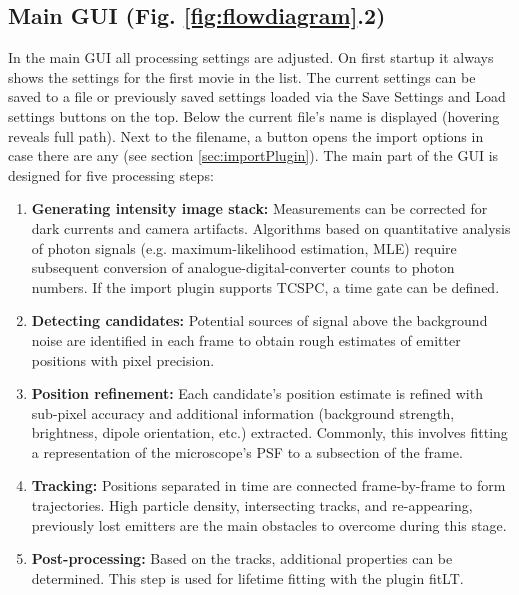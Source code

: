 \documentclass[11pt,onside]{report}
\numberwithin{equation}{chapter}
\begin{document}
\subsection{Main GUI (Fig. \ref{fig:flowdiagram}.2)}
In the main GUI all processing settings are adjusted. On first startup it always shows the settings for the first movie in the list. The current settings can be saved to a file or previously saved settings loaded via the \textsf{Save Settings} and \textsf{Load settings} buttons on the top. Below the current file's name is displayed (hovering reveals full path). Next to the filename, a button opens the import options in case there are any (see section \ref{sec:importPlugin}). The main part of the GUI is designed for five processing steps:
\begin{enumerate}
 \item \textbf{Generating intensity image stack:} Measurements can be corrected for dark currents and camera artifacts. Algorithms based on quantitative analysis of photon signals (e.g. maximum-likelihood estimation, MLE) require subsequent conversion of analogue-digital-converter counts to photon numbers. If the import plugin supports TCSPC, a time gate can be defined.
 \item \textbf{Detecting candidates:} Potential sources of signal above the background noise are identified in each frame to obtain rough estimates of emitter positions with pixel precision. %
  \item \textbf{Position refinement:} Each candidate's position estimate is refined with sub-pixel accuracy and additional information (background strength, brightness, dipole orientation, etc.) extracted. Commonly, this involves fitting a representation of the microscope's PSF to a subsection of the frame.
  \item \textbf{Tracking:} Positions separated in time are connected frame-by-frame to form trajectories. High particle density, intersecting tracks, and re-appearing, previously lost emitters are the main obstacles to overcome during this stage.
  \item \textbf{Post-processing:} Based on the tracks, additional properties can be determined. This step is used for lifetime fitting with the plugin \textsf{fitLT}.
\end{enumerate}
\end{document}
